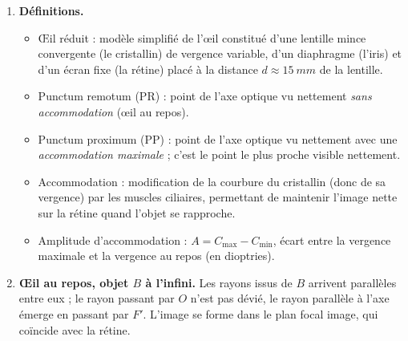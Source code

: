 \documentclass[11pt]{article}
\newcommand{\cle}[1]{{\popxbold\color{popdark}#1}}
\begin{document}
\begin{corrige}
\begin{enumerate}
\item \textbf{Définitions.}
\begin{itemize}
\item \cle{Œil réduit} : modèle simplifié de l'œil constitué d'une lentille mince convergente (le cristallin) de vergence variable, d'un diaphragme (l'iris) et d'un écran fixe (la rétine) placé à la distance $d \approx \SI{15}{mm}$ de la lentille.
\item \cle{Punctum remotum} (PR) : point de l'axe optique vu nettement \emph{sans accommodation} (œil au repos).
\item \cle{Punctum proximum} (PP) : point de l'axe optique vu nettement avec une \emph{accommodation maximale} ; c'est le point le plus proche visible nettement.
\item \cle{Accommodation} : modification de la courbure du cristallin (donc de sa vergence) par les muscles ciliaires, permettant de maintenir l'image nette sur la rétine quand l'objet se rapproche.
\item \cle{Amplitude d'accommodation} : $A = C_{\max} - C_{\min}$, écart entre la vergence maximale et la vergence au repos (en dioptries).
\end{itemize}
\item \textbf{Œil au repos, objet $B$ à l'infini.} Les rayons issus de $B$ arrivent parallèles entre eux ; le rayon passant par $O$ n'est pas dévié, le rayon parallèle à l'axe émerge en passant par $F'$. L'image se forme dans le plan focal image, qui coïncide avec la rétine.
\begin{popfigure}
\begin{center}
\end{center}
\end{popfigure}
\end{enumerate}
\end{corrige}
\end{document}
